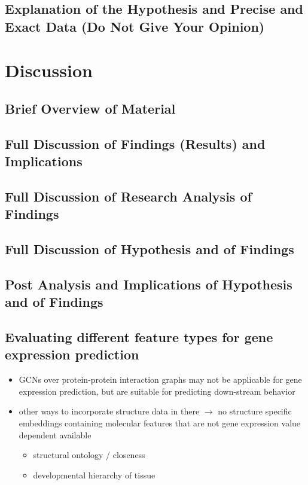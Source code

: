 \documentclass[]{article}
\begin{document}
\subsection*{Explanation of the Hypothesis and Precise and Exact Data (Do Not Give Your Opinion)}


\newpage
\section{Discussion}
\label{sec:discussion}
\subsection*{Brief Overview of Material}
\subsection*{Full Discussion of Findings (Results) and Implications}
\subsection*{Full Discussion of Research Analysis of Findings}
\subsection*{Full Discussion of Hypothesis and of Findings}
\subsection*{Post Analysis and Implications of Hypothesis and of Findings}

\subsection{Evaluating different feature types for gene expression prediction}

\begin{itemize}
	\item GCNs over protein-protein interaction graphs may not be applicable for gene expression prediction, but are suitable for predicting down-stream behavior 
	\item other ways to incorporate structure data in there $\rightarrow$ no structure specific embeddings containing molecular features that are not gene expression value dependent available
	\begin{itemize}
		\item structural ontology / closeness
		\item developmental hierarchy of tissue
	\end{itemize}
\end{itemize}
\end{document}
